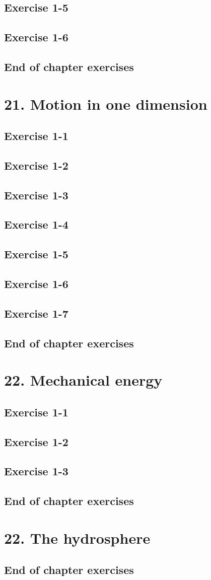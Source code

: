 \subsection{Exercise 1-5}
\subsection{Exercise 1-6}
\subsection{End of chapter exercises}
\section{21. Motion in one dimension}
\subsection{Exercise 1-1}
\subsection{Exercise 1-2}
\subsection{Exercise 1-3}
\subsection{Exercise 1-4}
\subsection{Exercise 1-5}
\subsection{Exercise 1-6}
\subsection{Exercise 1-7}
\subsection{End of chapter exercises}
\section{22. Mechanical energy}
\subsection{Exercise 1-1}
\subsection{Exercise 1-2}
\subsection{Exercise 1-3}
\subsection{End of chapter exercises}
\section{22. The hydrosphere}
\subsection{End of chapter exercises}